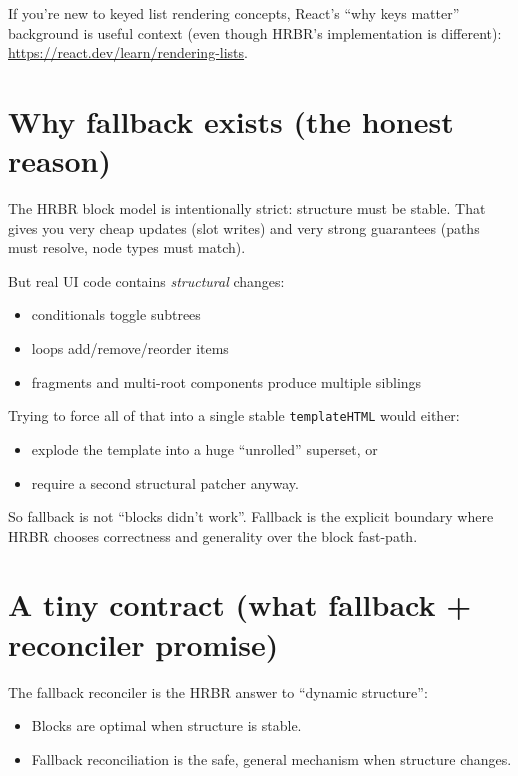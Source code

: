 If you’re new to keyed list rendering concepts, React’s “why keys matter” background is useful context
(even though HRBR’s implementation is different):
\href{https://react.dev/learn/rendering-lists}{https://react.dev/learn/rendering-lists}.

\section{Why fallback exists (the honest reason)}

The HRBR block model is intentionally strict: structure must be stable.
That gives you very cheap updates (slot writes) and very strong guarantees (paths must resolve, node types must match).

But real UI code contains \emph{structural} changes:

\begin{itemize}
  \item conditionals toggle subtrees
  \item loops add/remove/reorder items
  \item fragments and multi-root components produce multiple siblings
\end{itemize}

Trying to force all of that into a single stable \texttt{templateHTML} would either:

\begin{itemize}
  \item explode the template into a huge “unrolled” superset, or
  \item require a second structural patcher anyway.
\end{itemize}

So fallback is not “blocks didn’t work”.
Fallback is the explicit boundary where HRBR chooses correctness and generality over the block fast-path.

\section{A tiny contract (what fallback + reconciler promise)}

The fallback reconciler is the HRBR answer to “dynamic structure”:

\begin{itemize}
  \item Blocks are optimal when structure is stable.
  \item Fallback reconciliation is the safe, general mechanism when structure changes.
\end{itemize}

